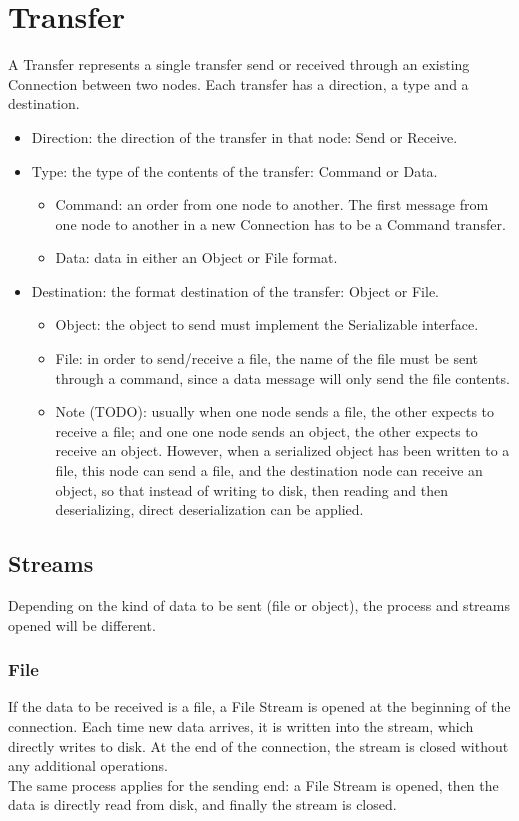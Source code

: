 \documentclass[11pt]{article}
\begin{document}
\section{Transfer}
	A Transfer represents a single transfer send or received through an existing Connection between two nodes. Each transfer has a direction, a type and a destination.
	\begin{itemize}
		\item Direction: the direction of the transfer in that node: Send or Receive.
		\item Type: the type of the contents of the transfer: Command or Data.
			\begin{itemize}
				\item Command: an order from one node to another. The first message from one node to another in a new Connection has to be a Command transfer.
				\item Data: data in either an Object or File format.
			\end{itemize}
		\item Destination: the format destination of the transfer: Object or File.
			\begin{itemize}
				\item Object: the object to send must implement the Serializable interface.
				\item File: in order to send/receive a file, the name of the file must be sent through a command, since a data message will only send the file contents.
				\item Note (TODO): usually when one node sends a file, the other expects to receive a file; and one one node sends an object, the other expects to receive an object. However, when a serialized object has been written to a file, this node can send a file, and the destination node can receive an object, so that instead of writing to disk, then reading and then deserializing, direct deserialization can be applied.
			\end{itemize}
	\end{itemize}
	\subsection{Streams}
	Depending on the kind of data to be sent (file or object), the process and streams opened will be different.
		\subsubsection{File}
			If the data to be received is a file, a File Stream is opened at the beginning of the connection. Each time new data arrives, it is written into the stream, which directly writes to disk. At the end of the connection, the stream is closed without any additional operations.\\ The same process applies for the sending end: a File Stream is opened, then the data is directly read from disk, and finally the stream is closed.
\end{document}
